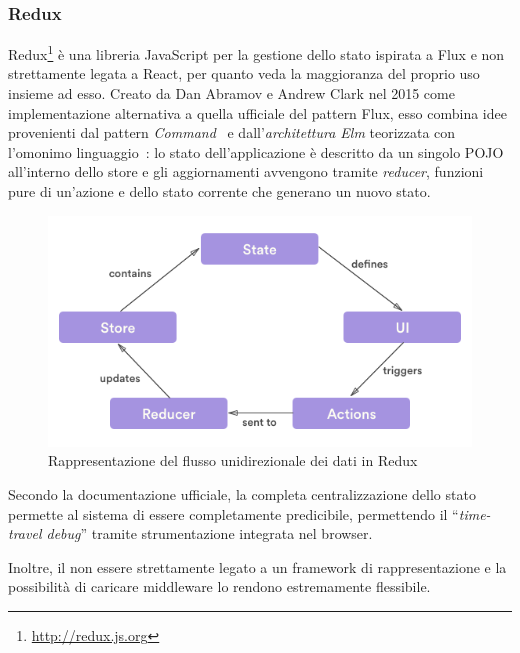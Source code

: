 \subsubsection{Redux}

Redux\footnote{\url{http://redux.js.org}} è una libreria JavaScript per la gestione dello stato ispirata a Flux e non strettamente legata a React, per quanto veda la maggioranza del proprio uso insieme ad esso.
Creato da Dan Abramov e Andrew Clark nel 2015 come implementazione alternativa a quella ufficiale del pattern Flux,
esso combina idee provenienti dal pattern \emph{Command}~\cite{10.5555/186897} e dall'\emph{architettura Elm} teorizzata con l'omonimo linguaggio~\cite{czaplicki2012elm}:
lo stato dell'applicazione è descritto da un singolo POJO all'interno dello store e gli aggiornamenti avvengono tramite \emph{reducer}, funzioni pure di un'azione e dello stato corrente che generano un nuovo stato.

\begin{figure}[htbp]
  \centering
  \includegraphics[width=\linewidth]{res/fig/redux-diagram.png}
  \caption{Rappresentazione del flusso unidirezionale dei dati in Redux}%
  \label{fig:redux}
\end{figure}

Secondo la documentazione ufficiale, la completa centralizzazione dello stato permette al sistema di essere completamente predicibile, permettendo il ``\emph{time-travel debug}'' tramite strumentazione integrata nel browser.

Inoltre, il non essere strettamente legato a un framework di rappresentazione e la possibilità di caricare middleware lo rendono estremamente flessibile.
